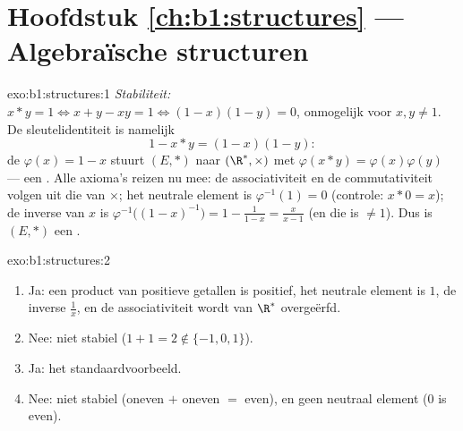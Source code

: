 \section*{Hoofdstuk \ref{ch:b1:structures} --- Algebraïsche structuren}

\begin{solution}{exo:b1:structures:1}
\emph{Stabiliteit:} $x * y = 1 \iff x + y - xy = 1 \iff (1-x)(1-y) = 0$,
onmogelijk voor $x, y \neq 1$. De sleutelidentiteit is namelijk
\[
1 - x * y = (1 - x)(1 - y):
\]
de  $\varphi(x) = 1 - x$ stuurt $(E, *)$ naar $(\R^*, \times)$
met $\varphi(x * y) = \varphi(x)\varphi(y)$ --- een  .
Alle axioma's reizen nu mee: de associativiteit en de commutativiteit
volgen uit die van $\times$; het neutrale element is $\varphi^{-1}(1) = 0$
(controle: $x * 0 = x$); de inverse van $x$ is
$\varphi^{-1}\bigl((1-x)^{-1}\bigr) = 1 - \frac{1}{1-x} = \frac{x}{x -
1}$ (en die is $\neq 1$). Dus is $(E, *)$ een .
\end{solution}

\begin{solution}{exo:b1:structures:2}
\begin{enumerate}
  \item Ja: een product van positieve getallen is positief, het neutrale
        element is $1$, de inverse $\frac 1x$, en de associativiteit
        wordt van $\R^*$ overgeërfd.
  \item Nee: niet stabiel ($1 + 1 = 2 \notin \{-1,0,1\}$).
  \item Ja: het standaardvoorbeeld.
  \item Nee: niet stabiel (oneven $+$ oneven $=$ even), en geen neutraal
        element ($0$ is even).
\end{enumerate}
\end{solution}

